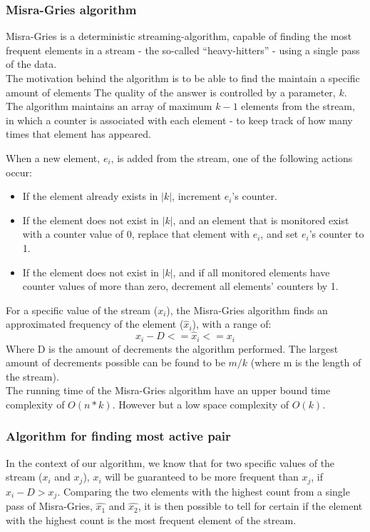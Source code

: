 \subsubsection{Misra-Gries algorithm}
Misra-Gries is a deterministic streaming-algorithm, capable of finding the most frequent 
elements in a stream - the so-called “heavy-hitters” - using a single pass of the data. \\ 
The motivation behind the algorithm is to be able to find the  maintain a specific amount of elements
The quality of the answer is controlled by a parameter, $k$. The algorithm maintains an array of maximum $k-1$ elements from the stream, in which a counter is associated with each element - to keep track of how many times that element has appeared.

When a new element, $e_i$, is added from the stream, one of the following actions occur:
\begin{itemize}
\item If the element already exists in $|k|$, increment $e_i$’s counter.
\item If the element does not exist in $|k|$, and  an element that is monitored exist with a counter value of 0, replace that element with $e_i$, and set $e_i$'s counter to 1.
\item If the element does not exist in $|k|$, and if all monitored elements have counter values of more than zero, decrement all elements’ counters by 1.
\end{itemize}

For a specific value of the stream ($x_i$), the Misra-Gries algorithm finds an approximated frequency of the element ($\hat{x}_i$), with a range of:
\begin{equation}
x_i - D <= \hat{x}_i <= x_i
\end{equation}
Where D is the amount of decrements the algorithm performed. The largest amount of decrements possible can be found to be $m/k$ (where m is the length of the stream). \\ 

The running time of the Misra-Gries algorithm have an upper bound time complexity of $O(n * k)$. However but a low space complexity of $O(k)$.

\subsubsection{Algorithm for finding most active pair}
In the context of our algorithm, we know that for two specific values of the stream ($x_i$ and $x_j$),  $x_i$ will be guaranteed to be more frequent than $x_j$, if $x_i - D > x_j$.
Comparing the two elements with the highest count from a single pass of Misra-Gries, $\hat{x_1}$ and $\hat{x_2}$, it is then possible to tell for certain if the element with the highest count is the most frequent element of the stream.


